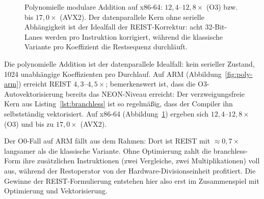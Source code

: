 \documentclass[11pt,a4paper]{scrartcl}
\theoremstyle{definition}
\theoremstyle{plain}
\theoremstyle{remark}
\begin{document}
\begin{figure}[htbp]
\centering
{}
\caption{Polynomielle modulare Addition auf x86-64: $12{,}4$--$12{,}8\times$ (O3) bzw. bis $17{,}0\times$ (AVX2). Der datenparallele Kern ohne serielle Abhängigkeit ist der Idealfall der REIST-Korrektur: acht 32-Bit-Lanes werden pro Instruktion korrigiert, während die klassische Variante pro Koeffizient die Restsequenz durchläuft.}
\label{fig:poly-x86}
\end{figure}

Die polynomielle Addition ist der datenparallele Idealfall: kein serieller Zustand, 1024 unabhängige Koeffizienten pro Durchlauf. Auf ARM (Abbildung~\ref{fig:poly-arm}) erreicht REIST $4{,}3$--$4{,}5\times$; bemerkenswert ist, dass die O3-Autovektorisierung bereits das NEON-Niveau erreicht: Der verzweigungsfreie Kern aus Listing~\ref{lst:branchless} ist so regelmäßig, dass der Compiler ihn selbstständig vektorisiert. Auf x86-64 (Abbildung~\ref{fig:poly-x86}) ergeben sich $12{,}4$--$12{,}8\times$ (O3) und bis zu $17{,}0\times$ (AVX2).

Der O0-Fall auf ARM fällt aus dem Rahmen: Dort ist REIST mit $\approx 0{,}7\times$ langsamer als die klassische Variante. Ohne Optimierung zahlt die branchless-Form ihre zusätzlichen Instruktionen (zwei Vergleiche, zwei Multiplikationen) voll aus, während der Restoperator von der Hardware-Divisionseinheit profitiert. Die Gewinne der REIST-Formulierung entstehen hier also erst im Zusammenspiel mit Optimierung und Vektorisierung.
\end{document}
